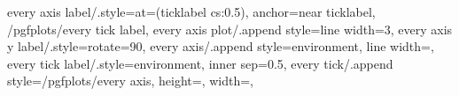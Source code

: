 \usepackage{pgfplots}
\pgfplotsset{compat=1.18}
\pgfplotsset
{
	every axis label/.style={at={(ticklabel cs:0.5)}, anchor=near ticklabel, /pgfplots/every tick label},
	every axis plot/.append style={line width=3\fboxrule},
	every axis y label/.style={rotate=90},
	every axis/.append style={environment, line width=\fboxrule},
	every tick label/.style={environment, inner sep=0.5\tabcolsep},
	every tick/.append style={/pgfplots/every axis},
	height=\hsize,
	width=\hsize,
}